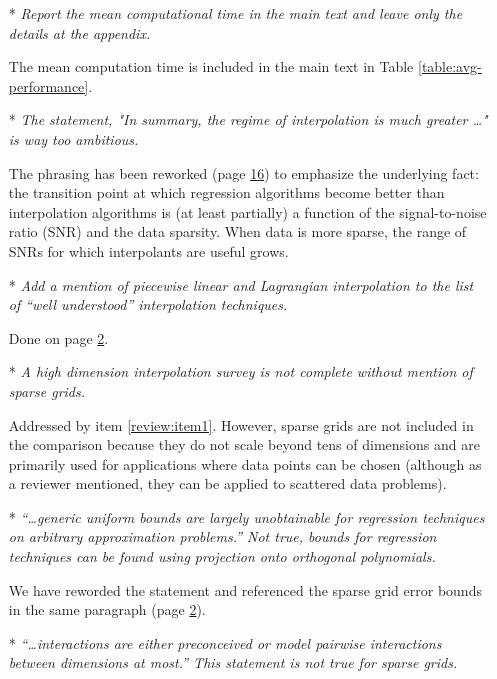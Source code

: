 \begin{itemize}[leftmargin=.5cm]
\item[*] {\it Report the mean computational time in the main text and leave only the details at the appendix.}\vspace{.2cm}

The mean computation time is included in the main text in Table \ref{table:avg-performance}.

\item[*] {\it The statement, "In summary, the regime of interpolation is much greater \ldots" is way too ambitious.}\vspace{.2cm}

The phrasing has been reworked (page \hyperlink{page.16}{16}) to emphasize the underlying fact: the transition point at which regression algorithms become better than interpolation algorithms is (at least partially) a function of the signal-to-noise ratio (SNR) and the data sparsity. When data is more sparse, the range of SNRs for which interpolants are useful grows.

\item[*] {\it Add a mention of piecewise linear and Lagrangian interpolation to the list of ``well understood'' interpolation techniques.}\vspace{.2cm}

Done on page \hyperlink{page.2}{2}.

\item[*] {\it A high dimension interpolation survey is not complete without mention of sparse grids.}\vspace{.2cm}

Addressed by item \ref{review:item1}. However, sparse grids are not included in the comparison because they do not scale beyond tens of dimensions and are primarily used for applications where data points can be chosen (although as a reviewer mentioned, they can be applied to scattered data problems).

\newpage\setcounter{page}{0}\thispagestyle{empty}
\item[*] {\it ``\ldots generic uniform bounds are largely unobtainable for regression techniques on arbitrary approximation problems.'' Not true, bounds for regression techniques can be found using projection onto orthogonal polynomials.}\vspace{.2cm}

We have reworded the statement and referenced the sparse grid error bounds in the same paragraph (page \hyperlink{page.2}{2}).

\item[*] {\it ``\ldots interactions are either preconceived or model pairwise interactions between dimensions at most.'' This statement is not true for sparse grids.}\vspace{.2cm}


\end{itemize}
